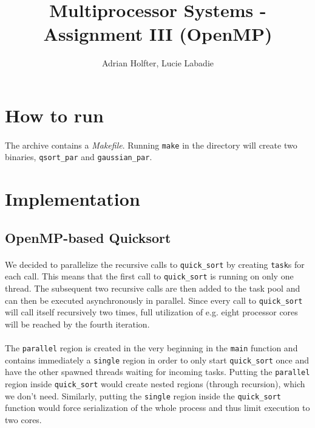 \documentclass[]{article}
\title{Multiprocessor Systems - Assignment III (OpenMP)}
\author{Adrian Holfter, Lucie Labadie}
\begin{document}
\maketitle

\section{How to run}

\paragraph{} The archive contains a \emph{Makefile}. Running \texttt{make} in the directory will create two binaries, \texttt{qsort\_par} and \texttt{gaussian\_par}.

\section{Implementation}

\subsection{OpenMP-based Quicksort}

\paragraph{} We decided to parallelize the recursive calls to \texttt{quick\_sort} by creating \texttt{task}s for each call. This means that the first call to \texttt{quick\_sort} is running on only one thread. The subsequent two recursive calls are then added to the task pool and can then be executed asynchronously in parallel. Since every call to \texttt{quick\_sort} will call itself recursively two times, full utilization of e.g. eight processor cores will be reached by the fourth iteration.

\paragraph{} The \texttt{parallel} region is created in the very beginning in the \texttt{main} function and contains immediately a \texttt{single} region in order to only start \texttt{quick\_sort} once and have the other spawned threads waiting for incoming tasks. Putting the \texttt{parallel} region inside \texttt{quick\_sort} would create nested regions (through recursion), which we don't need. Similarly, putting the \texttt{single} region inside the \texttt{quick\_sort} function would force serialization of the whole process and thus limit execution to two cores.
\end{document}
